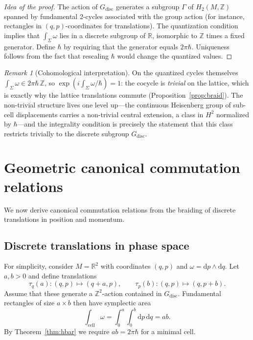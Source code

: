 \documentclass[11pt]{article}
\numberwithin{equation}{section}
\theoremstyle{definition}
\theoremstyle{remark}
\newtheorem{remark}[theorem]{Remark}
\newcommand{\Z}{\mathbb{Z}}
\newcommand{\R}{\mathbb{R}}
\newcommand{\dd}{\mathrm{d}}
\newcommand{\Gdisc}{G_{\mathrm{disc}}}
\begin{document}
	\begin{proof}[Idea of the proof]
		The action of $\Gdisc$ generates a subgroup $\Gamma$ of $H_2(M,\Z)$
		spanned by fundamental 2-cycles associated with the group action (for
		instance, rectangles in $(q,p)$-coordinates for translations).
		The quantization condition implies that $\int_\Sigma\omega$ lies in a
		discrete subgroup of $\R$, isomorphic to $\Z$ times a fixed generator.
		Define $\hbar$ by requiring that the generator equals $2\pi\hbar$.
		Uniqueness follows from the fact that rescaling $\hbar$ would change the
		quantized values.
	\end{proof}
	
	\begin{remark}[Cohomological interpretation]
		On the quantized cycles themselves $\int_\Sigma\omega\in 2\pi\hbar\,\Z$,
		so $\exp\!\left(i\int_\Sigma\omega/\hbar\right)=1$: the cocycle is
		\emph{trivial} on the lattice, which is exactly why the lattice
		translations commute (Proposition~\ref{prop:braid}). The non-trivial
		structure lives one level up---the continuous Heisenberg group of
		sub-cell displacements carries a non-trivial central extension, a
		class in $H^2$ normalized by $\hbar$---and the integrality condition
		is precisely the statement that this class restricts trivially to the
		discrete subgroup $\Gdisc$.
	\end{remark}
	
	
	\section{Geometric canonical commutation relations}
	\label{sec:CCR}
	
	We now derive canonical commutation relations from the braiding of
	discrete translations in position and momentum.
	
	\subsection{Discrete translations in phase space}
	
	For simplicity, consider $M=\R^2$ with coordinates $(q,p)$ and
	$\omega=\dd p\wedge\dd q$. Let $a,b>0$ and define translations
	\[
	\tau_q(a):(q,p)\mapsto (q+a,p),\qquad
	\tau_p(b):(q,p)\mapsto (q,p+b).
	\]
	Assume that these generate a $\Z^2$-action contained in $\Gdisc$.
	Fundamental rectangles of size $a\times b$ then have symplectic area
	\[
	\int_{\mathrm{cell}} \omega = \int_0^a \int_0^b \dd p\,\dd q = a b.
	\]
	By Theorem~\ref{thm:hbar} we require $ab=2\pi\hbar$ for a minimal cell.
	
\end{document}
